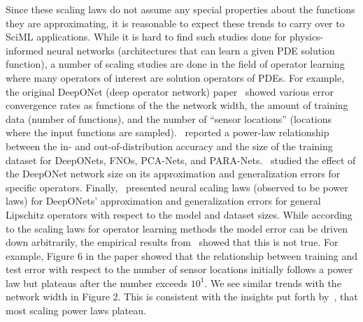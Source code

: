 Since these scaling laws do not assume any special properties about the functions they are approximating, it is reasonable to expect these trends to carry over to SciML applications. While it is hard to find such studies done for physics-informed neural networks (architectures that can learn a given PDE solution function), a number of scaling studies are done in the field of operator learning where many operators of interest are solution operators of PDEs. For example, the original DeepONet (deep operator network) paper~\citep{lu2019deeponet} showed various error convergence rates as functions of the the network width, the amount of training data (number of functions), and the number of ``sensor locations'' (locations where the input functions are sampled).~\citep{de2022cost} reported a power-law relationship between the in- and out-of-distribution accuracy and the size of the training dataset for DeepONets, FNOs, PCA-Nets, and PARA-Nets.~\citep{lanthaler2022error} studied the effect of the DeepONet network size on its approximation and generalization errors for specific operators. Finally,~\citep{liu2024neural} presented neural scaling laws (observed to be power laws) for DeepONets' approximation and generalization errors for general Lipschitz operators with respect to the model and dataset sizes. While according to the scaling laws for operator learning methods the model error can be driven down arbitrarily, the empirical results from~\citep{lu2019deeponet} showed that this is not true. For example, Figure 6 in the paper showed that the relationship between training and test error with respect to the number of sensor locations initially follows a power law but plateaus after the number exceeds $10^1$. We see similar trends with the network width in Figure 2. This is consistent with the insights put forth by~\citep{kaplan2020scaling}, that most scaling power laws plateau.


